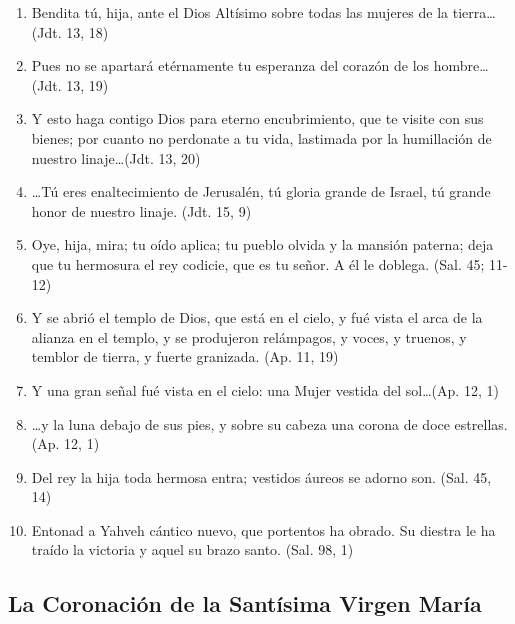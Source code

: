 \documentclass[a4paper,11pt]{article}
\begin{document}
      \begin{enumerate}

        \item Bendita tú, hija, ante el Dios Altísimo sobre todas las mujeres de la tierra\ldots (Jdt. 13, 18)

        \item Pues no se apartará etérnamente tu esperanza del corazón de los hombre\ldots (Jdt. 13, 19)

        \item Y esto haga contigo Dios para eterno encubrimiento, que te visite con sus bienes; por cuanto no perdonate
        a tu vida, lastimada por la humillación de nuestro linaje\ldots (Jdt. 13, 20)

        \item {\ldots}Tú eres enaltecimiento de Jerusalén, tú gloria grande de Israel, tú grande honor de nuestro linaje. (Jdt. 15, 9)

        \item Oye, hija, mira; tu oído aplica; tu pueblo olvida y la mansión paterna; deja que tu hermosura
        el rey codicie, que es tu señor. A él le doblega. (Sal. 45; 11-12)

        \item Y se abrió el templo de Dios, que está en el cielo, y fué vista el arca de la alianza en el templo,
        y se produjeron relámpagos, y voces, y truenos, y temblor de tierra, y fuerte granizada. (Ap. 11, 19)

        \item Y una gran señal fué vista en el cielo: una Mujer vestida del sol\ldots (Ap. 12, 1)

        \item {\ldots}y la luna debajo de sus pies, y sobre su cabeza una corona de doce estrellas. (Ap. 12, 1)

        \item Del rey la hija toda hermosa entra; vestidos áureos se adorno son. (Sal. 45, 14)

        \item Entonad a Yahveh cántico nuevo, que portentos ha obrado. Su diestra le ha traído la victoria y aquel su brazo santo. (Sal. 98, 1)

      \end{enumerate}

    \subsection*{\hfil La Coronación de la Santísima Virgen María \hfil}
\end{document}
